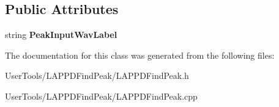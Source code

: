 \subsection*{Public Attributes}
\begin{DoxyCompactItemize}
\item 
\hypertarget{classLAPPDFindPeak_a65501ad571e2fa607ba84239eab718af}{string {\bfseries Peak\-Input\-Wav\-Label}}\label{classLAPPDFindPeak_a65501ad571e2fa607ba84239eab718af}

\end{DoxyCompactItemize}


The documentation for this class was generated from the following files\-:\begin{DoxyCompactItemize}
\item 
User\-Tools/\-L\-A\-P\-P\-D\-Find\-Peak/L\-A\-P\-P\-D\-Find\-Peak.\-h\item 
User\-Tools/\-L\-A\-P\-P\-D\-Find\-Peak/L\-A\-P\-P\-D\-Find\-Peak.\-cpp\end{DoxyCompactItemize}
